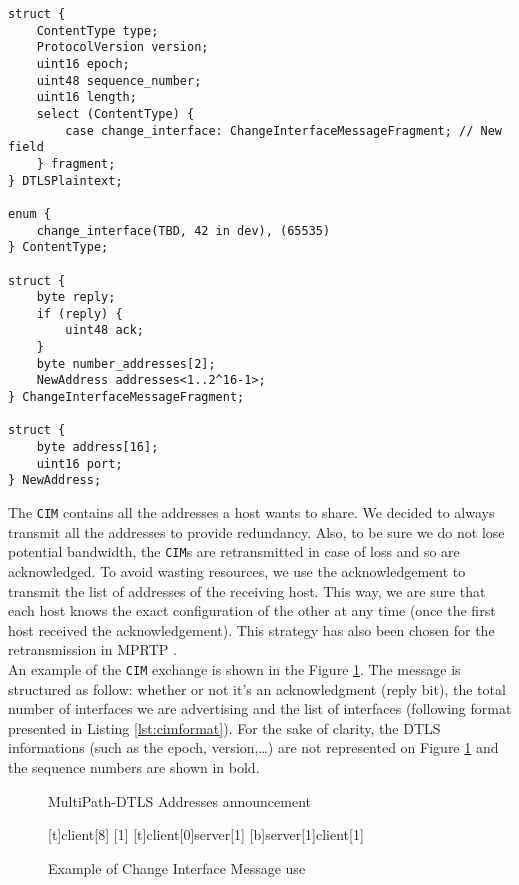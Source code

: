 \begin{lstlisting}[caption=Change Interface Message structure, label=lst:cimformat]
struct {
    ContentType type;
    ProtocolVersion version;
    uint16 epoch;
    uint48 sequence_number;
    uint16 length;
    select (ContentType) {
        case change_interface: ChangeInterfaceMessageFragment; // New field
    } fragment;
} DTLSPlaintext;

enum {
    change_interface(TBD, 42 in dev), (65535)
} ContentType;

struct {
    byte reply;
    if (reply) {
        uint48 ack;
    }
    byte number_addresses[2];
    NewAddress addresses<1..2^16-1>;
} ChangeInterfaceMessageFragment;

struct {
    byte address[16];
    uint16 port;
} NewAddress;
\end{lstlisting}

The \texttt{CIM} contains all the addresses a host wants to share. We decided to always transmit all the addresses to provide redundancy. Also, to be sure we do not lose potential bandwidth, the \texttt{CIM}s are retransmitted in case of loss and so are acknowledged. To avoid wasting resources, we use the acknowledgement to transmit the list of addresses of the receiving host. This way, we are sure that each host knows the exact configuration of the other at any time (once the first host received the acknowledgement). This strategy has also been chosen for the retransmission in MPRTP \cite{singh-avtcore-mprtp}.\\

An example of the \texttt{CIM} exchange is shown in the Figure \ref{fig:CIMexchange}. The message is structured as follow: whether or not it's an acknowledgment (reply bit), the total number of interfaces we are advertising and the list of interfaces (following format presented in Listing \ref{lst:cimformat}). For the sake of clarity, the DTLS informations (such as the epoch, version,\dots) are not represented on Figure \ref{fig:CIMexchange} and the sequence numbers are shown in bold.

\begin{figure}[!h]
\centering
\begin{msc}[r]{MultiPath-DTLS Addresses announcement}

\setlength{\instfootheight}{0em}
\setlength{\instheadheight}{0em}
\setlength{\instdist}{0.7\linewidth}
\setlength{\levelheight}{3em}


[t]{}{client}[8]
[1]
\nextlevel
{}[t]{client}[0]{server}[1]
\nextlevel
{}[b]{server}[1]{client}[1]
\nextlevel
\nextlevel

\end{msc}
\caption{Example of Change Interface Message use}
\label{fig:CIMexchange}
\end{figure}

